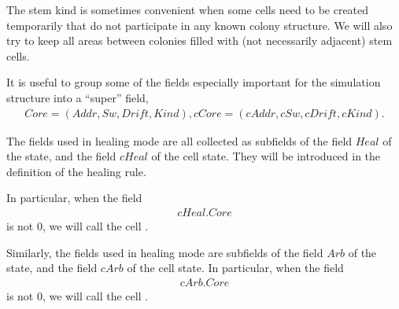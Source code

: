 \documentclass[12pt]{memoir}
\newcommand{\fld}[1]{\ensuremath{\textit{#1}}}
\newcommand{\Z}{Z}
\newcommand{\Addr}{\fld{Addr}}
\newcommand{\cAddr}{\fld{cAddr}}
\newcommand{\Arb}{\fld{Arb}}
\newcommand{\cArb}{\fld{cArb}}
\newcommand{\Core}{\fld{Core}}
\newcommand{\cCore}{\fld{cCore}}
\newcommand{\Drift}{\fld{Drift}}
\newcommand{\cDrift}{\fld{cDrift}}
\newcommand{\Kind}{\fld{Kind}}
\newcommand{\cKind}{\fld{cKind}}
\newcommand{\Heal}{\fld{Heal}}
\newcommand{\cHeal}{\fld{cHeal}}
\newcommand{\Sweep}{\fld{Sw}}
\newcommand{\cSweep}{\fld{cSw}}
\newcommand{\ZigDepth}{\fld{ZigDepth}}
\newcommand{\ZigDir}{\fld{ZigDir}}
\newcommand{\Stem}{\mathrm{Stem}}
\begin{document}
The stem kind is sometimes convenient when some cells need to be created temporarily
that do not participate in any known colony structure.
We will also try to keep all areas between colonies filled with (not necessarily adjacent)
stem cells.


It is useful to group some of the fields especially important for the simulation structure into
a ``super'' field,
    \begin{align}\label{eq:Core}
       \Core=(\Addr, \Sweep, \Drift, \Kind), 
        \cCore=(\cAddr, \cSweep, \cDrift, \cKind). %
    \end{align}


  The fields used in healing mode are all collected as subfields of the field
    \( \Heal \) of the state, and the field \( \cHeal \) of the cell state.
    They will be introduced in the definition of the healing rule.

    In particular, when the field
     \begin{align}\label{eq:cHealCore}
      \cHeal.\Core
     \end{align}
    is not \( 0 \), we will call the cell .

    Similarly, the fields used in healing mode are subfields of the field \( \Arb \) of the state,
    and the field \( \cArb \) of the cell state.
    In particular, when the field
     \begin{align}\label{eq:cArbCore}
      \cArb.\Core
     \end{align}
    is not \( 0 \), we will call the cell .

\end{document}
